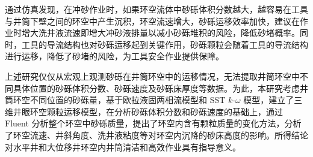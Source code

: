 通过仿真发现，在冲砂作业时，如果环空流体中砂砾体积分数越大，越容易在工具与井筒下壁之间的环空中产生沉积，环空流速增大，砂砾运移效率加快，建议在作业时增大洗井液流速即增大冲砂液排量以减小砂砾堆积的风险，降低砂堵概率。同时，工具的导流结构也对砂砾运移起到关键作用，砂砾颗粒会随着工具的导流结构进行运移，降低了砂堵的风险，为工具安全作业提供保障。

上述研究仅仅从宏观上观测砂砾在井筒环空中的运移情况，无法提取井筒环空中不同具体位置的砂砾体积分数、砂砾速度及砂砾床厚度等数据。为此，本研究考虑井筒环空不同位置的砂砾量，基于欧拉液固两相流模型和 SST \( k\)-\(\omega\) 模型，建立了三维井眼环空颗粒运移模型，在分析砂砾体积分数和砂砾速度的基础上，通过 Fluent 分析整个环空中砂砾质量，提出了环空内含有颗粒质量的变化方法，分析了环空流速、井斜角度、洗井液粘度等对环空内沉降的砂床高度的影响。所得结论对水平井和大位移井环空内井筒清洁和高效作业具有指导意义。




